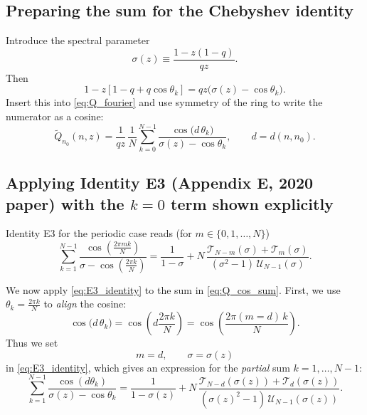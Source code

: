 \documentclass[11pt]{article}
\newcommand{\T}{\mathcal{T}}
\newcommand{\U}{\mathcal{U}}
\begin{document}
\subsection{Preparing the sum for the Chebyshev identity}

Introduce the spectral parameter
\begin{equation}
\sigma(z)\equiv \frac{1-z(1-q)}{qz}.
\label{eq:sigma_def}
\end{equation}
Then
\[
1-z[1-q+q\cos\theta_k]=qz\bigl(\sigma(z)-\cos\theta_k\bigr).
\]
Insert this into \eqref{eq:Q_fourier} and use symmetry of the ring to write the numerator as a cosine:
\begin{equation}
\tilde Q_{n_0}(n,z)
=\frac{1}{qz}\,\frac{1}{N}\sum_{k=0}^{N-1}\frac{\cos\!\bigl(d\,\theta_k\bigr)}{\sigma(z)-\cos\theta_k},
\qquad d=d(n,n_0).
\label{eq:Q_cos_sum}
\end{equation}

\subsection{Applying Identity E3 (Appendix E, 2020 paper) with the $k=0$ term shown explicitly}

Identity E3 for the periodic case reads (for $m\in\{0,1,\dots,N\}$)
\begin{equation}
\sum_{k=1}^{N-1}\frac{\cos\!\left(\frac{2\pi m k}{N}\right)}{\sigma-\cos\!\left(\frac{2\pi k}{N}\right)}
=
\frac{1}{1-\sigma}
+
N\,\frac{\T_{N-m}(\sigma)+\T_{m}(\sigma)}{(\sigma^2-1)\,\U_{N-1}(\sigma)}.
\label{eq:E3_identity}
\end{equation}

We now apply \eqref{eq:E3_identity} to the sum in \eqref{eq:Q_cos_sum}.
First, we use $\theta_k=\frac{2\pi k}{N}$ to \emph{align} the cosine:
\[
\cos\!\bigl(d\,\theta_k\bigr)
=\cos\!\left(d\frac{2\pi k}{N}\right)
=\cos\!\left(\frac{2\pi (m=d)\,k}{N}\right).
\]
Thus we set
\[
m=d,\qquad \sigma=\sigma(z)
\]
in \eqref{eq:E3_identity}, which gives an expression for the \emph{partial} sum $k=1,\dots,N-1$:
\begin{equation}
\sum_{k=1}^{N-1}\frac{\cos(d\theta_k)}{\sigma(z)-\cos\theta_k}
=
\frac{1}{1-\sigma(z)}
+
N\,\frac{\T_{N-d}(\sigma(z))+\T_{d}(\sigma(z))}{(\sigma(z)^2-1)\,\U_{N-1}(\sigma(z))}.
\label{eq:partial_sum}
\end{equation}
\end{document}

